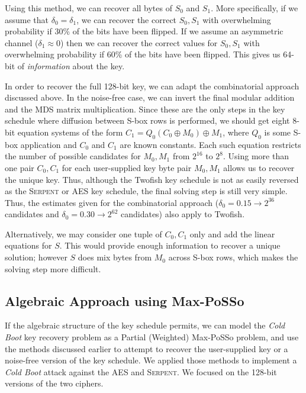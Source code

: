 \documentclass{llncs}
\newcommand{\Serpent}{\textsc{Serpent}\xspace}
\newcommand{\coldboot}{\emph{Cold Boot}\xspace}
\begin{document}
Using this method, we can recover all bytes of $S_0$ and $S_1$.
More specifically, if we assume that $\delta_0 = \delta_1$, we can recover the correct $S_0,S_1$ with overwhelming probability if 30\% of the bits have been flipped. If we assume an asymmetric channel ($\delta_1 \approx 0$) then we can recover the correct values for $S_0,S_1$ with overwhelming probability if 60\% of the bits have been flipped. This gives us 64-bit of \emph{information} about the key.

In order to recover the full 128-bit key, we can adapt the combinatorial approach discussed above. In the noise-free case, we can invert the final modular addition and the MDS matrix multiplication. Since these are the only steps in the key schedule where diffusion between S-box rows is performed, we should get eight 8-bit equation systems of the form $C_1 = Q_0(C_0 \oplus M_0) \oplus M_1$, where $Q_0$ is some S-box application and $C_0$ and $C_1$ are known constants. Each such equation restricts the number of possible candidates for $M_0,M_1$ from $2^{16}$ to $2^{8}$. Using more than one pair $C_0,C_1$ for each user-supplied key byte pair $M_0,M_1$ allows us to recover the unique key. Thus, although the Twofish key schedule is not as easily reversed as the \Serpent or AES key schedule, the final solving step is still very simple. 
Thus, the estimates given for the combinatorial approach ($\delta_0 = 0.15 \rightarrow 2^{36}$ candidates and $\delta_0 = 0.30 \rightarrow 2^{62}$ candidates) also apply to Twofish.

Alternatively, we may consider one tuple of $C_{0},C_{1}$ only and add the linear equations for $S$. This would provide enough information to recover a unique solution; however $S$ does mix bytes from $M_0$ across S-box rows, which makes the solving step more difficult.

\subsection{Algebraic Approach using Max-PoSSo}
\label{sec:max-posso}
If the algebraic structure of the key schedule permits, we can model the \coldboot key recovery problem as a Partial (Weigh\-ted) Max-PoSSo problem, and use the methods
discussed earlier to attempt to recover the user-supplied key or a noise-free version of the key schedule. 
We applied those methods to implement a \coldboot attack against the AES and \Serpent. We focused on the 128-bit versions of the two ciphers.
\end{document}
